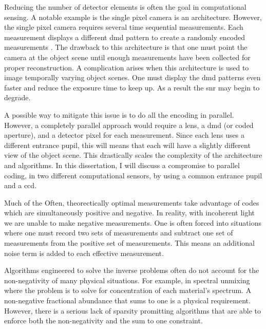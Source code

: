 Reducing the number of detector elements is often the goal in computational sensing. A notable example is the single pixel camera is an architecture. However, the single pixel camera requires several time sequential measurements. Each measurement displays a different \gls{dmd} pattern to create a randomly encoded measurements \cite{duarte2008single}. The drawback to this architecture is that one must point the camera at the object scene until enough measurements have been collected for proper reconstruction. A complication arises when this architecture is used to image temporally varying object scenes. One must display the \gls{dmd} patterns even faster and reduce the exposure time to keep up. As a result the \gls{snr} may begin to degrade. 

A possible way to mitigate this issue is to do all the encoding in parallel. However, a completely parallel approach would require a lens, a \gls{dmd} (or coded aperture), and a detector pixel for each measurement. Since each lens uses a different entrance pupil, this will means that each will have a slightly different view of the object scene. This drastically scales the complexity of the architecture and algorithms. In this dissertation, I will discuss a compromise to parallel coding, in two different computational sensors, by using a common entrance pupil and a \gls{ccd}.

Much of the Often, theorectically optimal measurements take advantage of codes which are simultaneously positive and negative. In reality, with incoherent light we are unable to make negative measurements. One is often forced into situations where one must record two sets of measurements and subtract one set of measurements from the positive set of measurements. This means an additional noise term is added to each effective measurement. 

Algorithms engineered to solve the inverse problems often do not account for the non-negativity of many physical situations. For example, in spectral unmixing where the problem is to solve for concentration of each material's spectrum. A non-negative fractional abundance that sums to one is a physical requirement. However, there is a serious lack of sparsity promitting algorithms that are able to enforce both the non-negativity and the sum to one constraint. 

